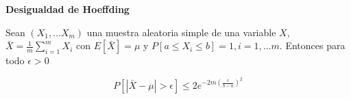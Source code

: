 \begin{lemma} \textbf{Desigualdad de Hoeffding}

 Sean $(X_1, \ldots X_m)$ una muestra aleatoria simple de una variable $X$, 
 $\bar{X} = \frac{1}{m} \sum_{i=1}^m X_i$ con $E[\bar{X}] = \mu$ y $P[a \le X_i \le b] = 1, i=1, \ldots m$. 
 Entonces para todo $\epsilon > 0$

 \[P\left[\left| \bar{X} - \mu \right| > \epsilon \right] \le 2e^{-2m \left(\frac{\epsilon}{b-a}\right)^2}\]
\end{lemma}
